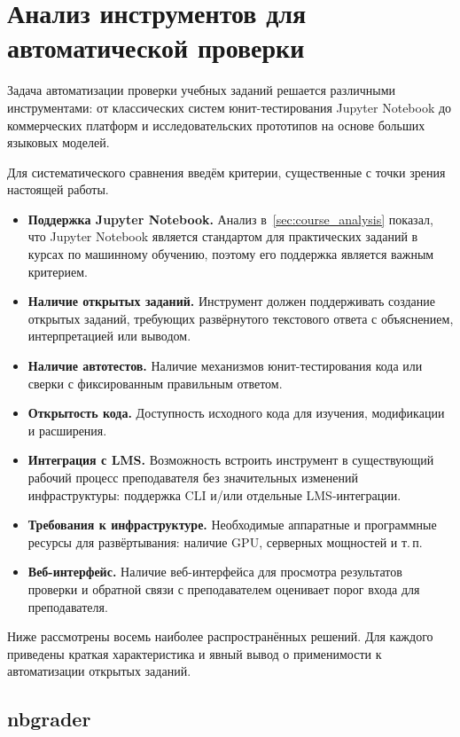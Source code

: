\section{Анализ инструментов для автоматической проверки}\label{sec:tools}

Задача автоматизации проверки учебных заданий решается различными инструментами:
от классических систем юнит-тестирования Jupyter Notebook до коммерческих платформ
и исследовательских прототипов на основе больших языковых моделей.

Для систематического сравнения введём критерии, существенные с точки зрения
настоящей работы.

\begin{itemize}
    \item \textbf{Поддержка Jupyter Notebook.} Анализ в~\ref{sec:course_analysis}  показал, что Jupyter Notebook является стандартом для практических заданий в курсах по машинному 
    обучению, поэтому его поддержка является важным критерием.
    \item \textbf{Наличие открытых заданий.} Инструмент должен поддерживать создание открытых заданий,
    требующих развёрнутого текстового ответа с объяснением, интерпретацией или выводом.
    \item \textbf{Наличие автотестов.} Наличие механизмов юнит-тестирования
    кода или сверки с фиксированным правильным ответом.
    \item \textbf{Открытость кода.} Доступность исходного кода для изучения,
    модификации и расширения.
    \item \textbf{Интеграция с LMS.} Возможность встроить инструмент в
    существующий рабочий процесс преподавателя без значительных изменений
    инфраструктуры: поддержка CLI и/или отдельные LMS-интеграции.
    \item \textbf{Требования к инфраструктуре.} Необходимые аппаратные и
    программные ресурсы для развёртывания: наличие GPU, серверных мощностей
    и т.\,п.
    \item \textbf{Веб-интерфейс.} Наличие веб-интерфейса для просмотра результатов 
    проверки и обратной связи с преподавателем оценивает порог входа для преподавателя.
\end{itemize}

Ниже рассмотрены восемь наиболее распространённых решений. Для каждого
приведены краткая характеристика и явный вывод о применимости к автоматизации
открытых заданий.

\subsection{nbgrader}

